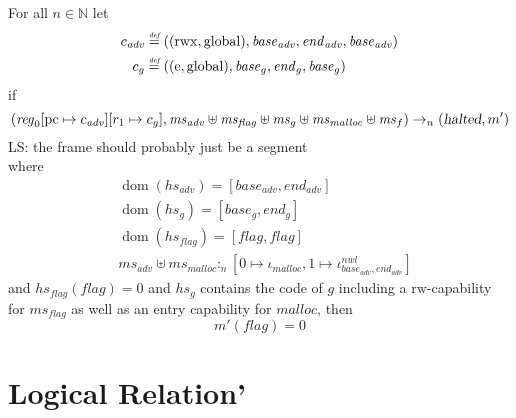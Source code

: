 \documentclass[a4paper]{article}
\newcommand{\forcenewline}{$\phantom{v}$\\}
\newcommand{\update}[2]{[#1 \mapsto #2]}
\newcommand{\defeq}{\stackrel{\textit{\tiny{def}}}{=}}
\DeclareMathOperator{\dom}{dom}
\newcommand\lau[1]{{\color{purple} \sf \footnotesize {LS: #1}}\\}
\newcommand{\var}[1]{\mathit{#1}}
\newcommand{\hs}{\var{ms}}
\newcommand{\ms}{\hs}
\newcommand{\pcreg}{\mathrm{pc}}
\newcommand{\start}{\var{base}}
\newcommand{\addrend}{\var{end}}
\newcommand{\reg}{\var{reg}}
\newcommand{\heap}{\var{mem}}
\newcommand{\adv}{\var{adv}}
\newcommand{\flag}{\var{flag}}
\newcommand{\halted}{\textsl{halted}}
\newcommand{\heapSat}[3][\heap]{#1 :_{#2} #3}
\newcommand{\codelabel}[1]{\mathit{#1}}
\newcommand{\malloc}{\codelabel{malloc}}
\newcommand{\nats}{\mathbb{N}}
\newcommand{\plainperm}[1]{\mathrm{#1}}
\newcommand{\readwrite}{\plainperm{rw}}
\newcommand{\entry}{\plainperm{e}}
\newcommand{\rwx}{\plainperm{rwx}}
\newcommand{\glob}{\plainperm{global}}
\newcommand{\step}[1][]{\rightarrow_{#1}}
\begin{document}
\begin{lemma}
\begin{lemma}\forcenewline
  For all $n \in \nats$
  let
  \begin{align*}
    c_{\var{adv}} & \defeq ((\rwx,\glob),\start_{\adv},\addrend_{\adv},\start_{\adv}) \\
    c_{g} & \defeq ((\entry,\glob),\start_g,\addrend_g,\start_g)
  \end{align*}
  if
  \[
    (\reg_0\update{\pcreg}{c_{\adv}}
    \update{r_1}{c_g},\hs_{\adv} \uplus \hs_{\flag} \uplus \hs_{g} \uplus \hs_{\malloc} \uplus \ms_f) \step[n] (\halted,m')
  \]
  \lau{the frame should probably just be a segment}
  where 
  \begin{align*}
    &\dom(hs_{\adv}) = [\start_\adv,\addrend_\adv] \\
    &\dom(hs_g) = [\start_g,\addrend_g] \\
    &\dom(hs_\flag) = [\flag,\flag] \\
    &\heapSat[\hs_{\adv} \uplus \hs_{\malloc}]{n}{[0 \mapsto \iota_{\malloc}, 1 \mapsto\iota^{\var{nwl}}_{\start_\adv,\addrend_\adv}]}
  \end{align*}
  and $hs_\flag(\flag) = 0$ and $hs_g$ contains the code of $g$ including a $\readwrite$-capability for $\hs_\flag$ as well as an entry capability for $\malloc$, 
  then
  \[
    m'(\flag) = 0
  \]
\end{lemma}


\section{Logical Relation'}

\end{lemma}
\end{document}
